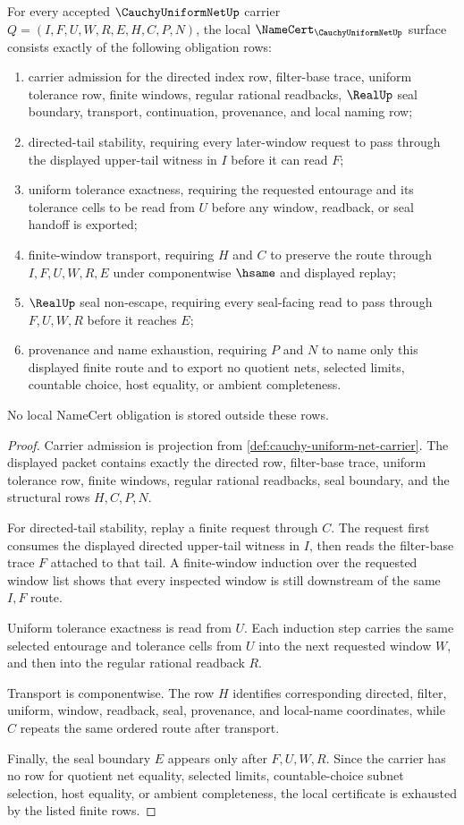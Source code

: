 \begin{theorem}
\label{thm:cauchy-uniform-net-namecert-obligations}
For every accepted $\CauchyUniformNetUp$ carrier $Q=(I,F,U,W,R,E,H,C,P,N)$, the local $\NameCert_{\CauchyUniformNetUp}$ surface consists exactly of the following obligation rows:
\begin{enumerate}
\item carrier admission for the directed index row, filter-base trace, uniform tolerance row, finite windows, regular rational readbacks, $\RealUp$ seal boundary, transport, continuation, provenance, and local naming row;
\item directed-tail stability, requiring every later-window request to pass through the displayed upper-tail witness in $I$ before it can read $F$;
\item uniform tolerance exactness, requiring the requested entourage and its tolerance cells to be read from $U$ before any window, readback, or seal handoff is exported;
\item finite-window transport, requiring $H$ and $C$ to preserve the route through $I,F,U,W,R,E$ under componentwise $\hsame$ and displayed replay;
\item $\RealUp$ seal non-escape, requiring every seal-facing read to pass through $F,U,W,R$ before it reaches $E$;
\item provenance and name exhaustion, requiring $P$ and $N$ to name only this displayed finite route and to export no quotient nets, selected limits, countable choice, host equality, or ambient completeness.
\end{enumerate}
No local NameCert obligation is stored outside these rows.
\end{theorem}
\begin{proof}
Carrier admission is projection from \autoref{def:cauchy-uniform-net-carrier}. The displayed packet contains exactly the directed row, filter-base trace, uniform tolerance row, finite windows, regular rational readbacks, seal boundary, and the structural rows $H,C,P,N$.

For directed-tail stability, replay a finite request through $C$. The request first consumes the displayed directed upper-tail witness in $I$, then reads the filter-base trace $F$ attached to that tail. A finite-window induction over the requested window list shows that every inspected window is still downstream of the same $I,F$ route.

Uniform tolerance exactness is read from $U$. Each induction step carries the same selected entourage and tolerance cells from $U$ into the next requested window $W$, and then into the regular rational readback $R$.

Transport is componentwise. The row $H$ identifies corresponding directed, filter, uniform, window, readback, seal, provenance, and local-name coordinates, while $C$ repeats the same ordered route after transport.

Finally, the seal boundary $E$ appears only after $F,U,W,R$. Since the carrier has no row for quotient net equality, selected limits, countable-choice subnet selection, host equality, or ambient completeness, the local certificate is exhausted by the listed finite rows.
\end{proof}
